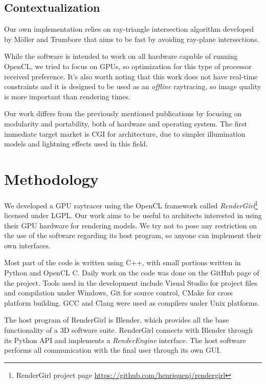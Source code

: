 \documentclass[a4paper]{sbgames}               %
\begin{document}
\subsection{Contextualization}

Our own implementation relies on ray-triangle intersection algorithm
developed by Möller and Trumbore that aims to be fast by avoiding
ray-plane intersections\cite{moller}.

While the software is intended to work on all hardware capable of
running OpenCL, we tried to focus on GPUs, so optimization for this
type of processor received preference. It's also worth noting that
this work does not have real-time constraints and it is designed to be
used as an \emph{offline} raytracing, so image quality is more
important than rendering times.

Our work differs from the previously mentioned publications by
focusing on modularity and portability, both of hardware and operating
system. The first immediate target market is CGI for architecture, due
to simpler illumination models and lightning effects used in this
field.

\section{Methodology}
\label{sec:methodology}

We developed a GPU raytracer using the OpenCL framework called
\emph{RenderGirl}\footnote{RenderGirl project page
\url{https://github.com/henriquenj/rendergirl}} licensed under
LGPL. Our work aims to be useful to architects interested in using
their GPU hardware for rendering models. We try not to pose any
restriction on the use of the software regarding its host program, so
anyone can implement their own interfaces.

Most part of the code is written using C++, with small portions
written in Python and OpenCL C. Daily work on the code was done on the
GitHub page of the project. Tools used in the
development include Visual Studio for project files and compilation
under Windows, Git for source control, CMake for cross platform
building. GCC and Clang were used as compilers under Unix platforms.

The host program of RenderGirl is Blender, which provides all the base
functionality of a 3D software suite. RenderGirl connects with Blender
through its Python API and implements a \emph{RenderEngine}
interface. The host software performs all communication with the final
user through its own GUI.
\end{document}
